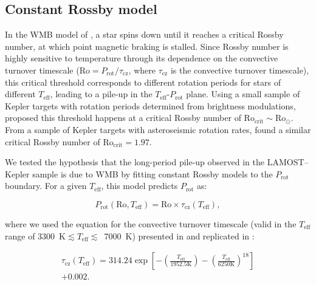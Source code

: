 \documentclass[twocolumn]{aastex631}
\newcommand{\teff}{\ensuremath{T_{\mathrm{eff}}}\xspace}
\newcommand{\prot}{\ensuremath{P_\mathrm{rot}}\xspace}
\begin{document}
\subsection{Constant Rossby model}
\label{subsec:rossby}
In the WMB model of \citet{vanSaders2016, vanSaders2019}, a star spins down until it reaches a critical Rossby number, at which point magnetic braking is stalled. Since Rossby number is highly sensitive to temperature through its dependence on the convective turnover timescale ($\mathrm{Ro} = P_\mathrm{rot}/\tau_\mathrm{cz}$, where $\tau_\mathrm{cz}$ is the convective turnover timescale), this critical threshold corresponds to different rotation periods for stars of different \teff, leading to a pile-up in the \teff-\prot plane. Using a small sample of Kepler targets with rotation periods determined from brightness modulations, \citet{vanSaders2016} proposed this threshold happens at a critical Rossby number of $\mathrm{Ro_{crit}} \sim \mathrm{Ro_\odot}$. From a sample of Kepler targets with asteroseismic rotation rates, \citet{Hall2021} found a similar critical Rossby number of $\mathrm{Ro_{crit}} = 1.97$.

We tested the hypothesis that the long-period pile-up observed in the LAMOST--Kepler sample is due to WMB by fitting constant Rossby models to the \prot boundary. For a given \teff, this model predicts \prot as: 

\begin{equation}
    \prot (\mathrm{Ro}, \teff) = \mathrm{Ro} \times \tau_\mathrm{cz}(\teff),
\end{equation}

where we used the equation for the convective turnover timescale (valid in the \teff range of 3300~K$\lesssim \teff \lesssim$~7000~K) presented in \citet{Gunn1998} and replicated in \citet{CranmerSaar2011}:

\begin{multline}
\tau_\mathrm{cz}(\teff) = 314.24\exp \left [ -\left (\frac{T_\mathrm{eff}}{1952.5 \mathrm{K}}  \right ) - \left (\frac{T_\mathrm{eff}}{6250 \mathrm{K}}  \right )^{18} \right ] \\+ 0.002.
\end{multline}
\end{document}
